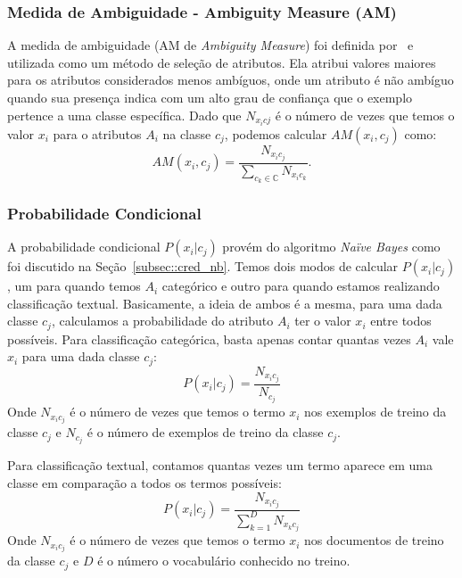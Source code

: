 \subsubsection{Medida de Ambiguidade - Ambiguity Measure (AM)}
\label{subsubsection::am}

A medida de ambiguidade (AM de \textit{Ambiguity Measure}) foi definida por~\cite{Mengle08} e utilizada como um método de seleção de atributos. Ela atribui valores maiores para os atributos considerados menos ambíguos, onde um atributo é não ambíguo quando sua presença indica com um alto grau de confiança que o exemplo pertence a uma classe específica. Dado que $N_{x_{i}c{j}}$ é o número de vezes que temos o valor $x_i$ para o atributos $A_i$ na classe $c_j$, podemos calcular $AM(x_i, c_j)$ como:
\begin{equation}\label{eqn::am}
   AM(x_i, c_j) = \frac{ N_{x_{i}c_{j}}}{\sum\limits_{c_k \in \mathbb{C}} N_{x_{i}c_{k}}}.
\end{equation}

\subsubsection{Probabilidade Condicional}
\label{subsubsection::pc}

A probabilidade condicional $P(x_i|c_j)$ provém do algoritmo \textit{Naïve Bayes} como foi discutido na Seção~\ref{subsec::cred_nb}.
Temos dois modos de calcular $P(x_i|c_j)$, um para quando temos $A_i$ categórico e outro para quando estamos realizando classificação textual.
Basicamente, a ideia de ambos é a mesma, para uma dada classe $c_j$, calculamos a probabilidade do atributo $A_i$ ter o valor $x_i$ entre todos possíveis. 
Para classificação categórica, basta apenas contar quantas vezes $A_i$ vale $x_i$ para uma dada classe $c_j$:
    \begin{equation}\label{eqn::nbcattexto}
        P(x_i|c_j) = \frac{ N_{x_{i}c_{j}} }{ N_{c_{j}} } 
    \end{equation}
Onde $N_{x_{i}c_{j}}$ é o número de vezes que temos o termo $x_i$ nos exemplos de treino da classe $c_j$ e $N_{c_{j}}$ é o número de exemplos de treino da classe $c_j$.
        
Para classificação textual, contamos quantas vezes um termo aparece em uma classe em comparação a todos os termos possíveis:
    \begin{equation}\label{eqn::nbcattexto}
        P(x_i|c_j) = \frac{ N_{x_{i}c_{j}} }{ \sum\limits^{D}_{k = 1} {  N_{x_{k}c_{j}}} } 
    \end{equation}
Onde $N_{x_{i}c_{j}}$ é o número de vezes que temos o termo $x_i$ nos documentos de treino da classe $c_j$ e $D$ é o número o vocabulário conhecido no treino.

